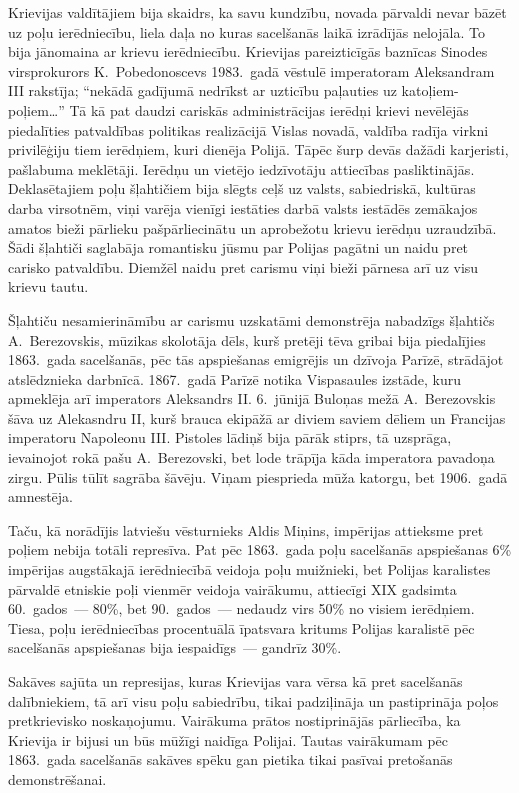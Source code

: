 \documentclass[twoside,a5paper,12pt,fleqn,openany]{extbook}
\begin{document}
Krievijas valdītājiem bija skaidrs, ka savu kundzību, novada pārvaldi nevar bāzēt uz poļu ierēdniecību, liela daļa no kuras sacelšanās laikā izrādījās nelojāla. To bija jānomaina ar krievu ierēdniecību. Krievijas pareizticīgās baznīcas Sinodes virsprokurors K.~Pobedonoscevs 1983.~gadā vēstulē imperatoram Aleksandram III rakstīja; ``nekādā gadījumā nedrīkst ar uzticību paļauties uz katoļiem-poļiem\dots{}'' Tā kā pat daudzi cariskās administrācijas ierēdņi krievi nevēlējās piedalīties patvaldības politikas realizācijā Vislas novadā, valdība radīja virkni privilēģiju tiem ierēdņiem, kuri dienēja Polijā. Tāpēc šurp devās dažādi karjeristi, pašlabuma meklētāji. Ierēdņu un vietējo iedzīvotāju attiecības pasliktinājās. Deklasētajiem poļu šļahtičiem bija slēgts ceļš uz valsts, sabiedriskā, kultūras darba virsotnēm, viņi varēja vienīgi iestāties darbā valsts iestādēs zemākajos amatos bieži pārlieku pašpārliecinātu un aprobežotu krievu ierēdņu uzraudzībā. Šādi šļahtiči saglabāja romantisku jūsmu par Polijas pagātni un naidu pret carisko patvaldību. Diemžēl naidu pret carismu viņi bieži pārnesa arī uz visu krievu tautu.

Šļahtiču nesamierināmību ar carismu uzskatāmi demonstrēja nabadzīgs šļahtičs A.~Berezovskis, mūzikas skolotāja dēls, kurš pretēji tēva gribai bija piedalījies 1863.~gada sacelšanās, pēc tās apspiešanas emigrējis un dzīvoja Parīzē, strādājot atslēdznieka darbnīcā. 1867.~gadā Parīzē notika Vispasaules izstāde, kuru apmeklēja arī imperators Aleksandrs II. 6.~jūnijā Buloņas mežā A.~Berezovskis šāva uz Alekasndru II, kurš brauca ekipāžā ar diviem saviem dēliem un Francijas imperatoru Napoleonu III. Pistoles lādiņš bija pārāk stiprs, tā uzsprāga, ievainojot rokā pašu A.~Berezovski, bet lode trāpīja kāda imperatora pavadoņa zirgu. Pūlis tūlīt sagrāba šāvēju. Viņam piesprieda mūža katorgu, bet 1906.~gadā amnestēja.

Taču, kā norādījis latviešu vēsturnieks Aldis Miņins, impērijas attieksme pret poļiem nebija totāli represīva. Pat pēc 1863.~gada poļu sacelšanās apspiešanas 6\% impērijas augstākajā ierēdniecībā veidoja poļu muižnieki, bet Polijas karalistes pārvaldē etniskie poļi vienmēr veidoja vairākumu, attiecīgi XIX gadsimta 60.~gados~--- 80\%, bet 90.~gados~--- nedaudz virs 50\% no visiem ierēdņiem. Tiesa, poļu ierēdniecības procentuālā īpatsvara kritums Polijas karalistē pēc sacelšanās apspiešanas bija iespaidīgs~--- gandrīz 30\%.

Sakāves sajūta un represijas, kuras Krievijas vara vērsa kā pret sacelšanās dalībniekiem, tā arī visu poļu sabiedrību, tikai padziļināja un pastiprināja poļos pretkrievisko noskaņojumu. Vairākuma prātos nostiprinājās pārliecība, ka Krievija ir bijusi un būs mūžīgi naidīga Polijai. Tautas vairākumam pēc 1863.~gada sacelšanās sakāves spēku gan pietika tikai pasīvai pretošanās demonstrēšanai.
\end{document}

